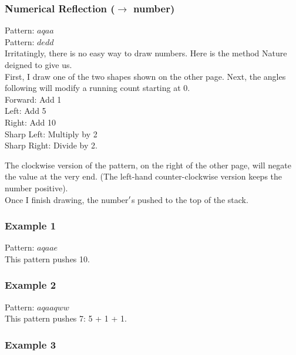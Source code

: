 \documentclass[12pt]{article}
\begin{document}
\subsubsection*{Numerical Reflection ($\rightarrow$ number)}

    Pattern: $aqaa$\\
    Pattern: $dedd$\\
      Irritatingly, there is no easy way to draw numbers. Here is the method Nature deigned to give us.\\


  
    First, I draw one of the two shapes shown on the other page. Next, the angles following will modify a running count starting at 0.\\Forward: Add 1\\Left: Add 5\\Right: Add 10\\Sharp Left: Multiply by 2\\Sharp Right: Divide by 2.

The clockwise version of the pattern, on the right of the other page, will negate the value at the very end. (The left-hand counter-clockwise version keeps the number positive).\\Once I finish drawing, the number$\rq$s pushed to the top of the stack.\\


  \subsubsection*{Example 1}

    Pattern: $aqaae$\\
      This pattern pushes 10.\\



  \subsubsection*{Example 2}

    Pattern: $aqaaqww$\\
      This pattern pushes 7: 5 + 1 + 1.\\



  \subsubsection*{Example 3}
\end{document}
